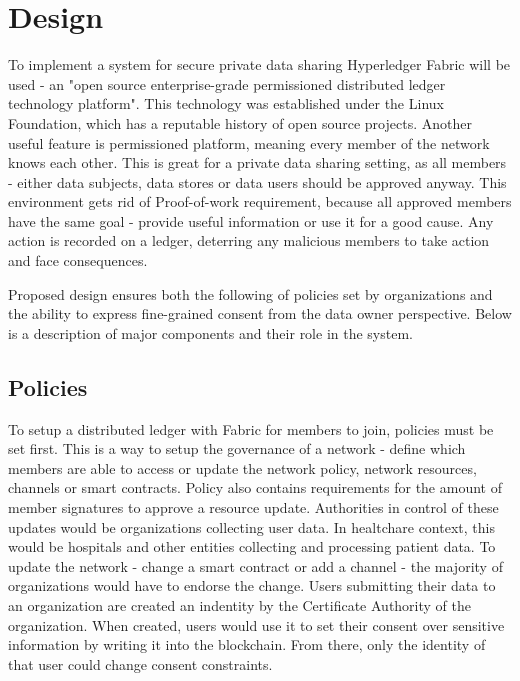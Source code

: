 \documentclass[12pt]{article}
\begin{document}
    \section{Design}

    To implement a system for secure private data sharing Hyperledger Fabric will be used - an "open source enterprise-grade permissioned distributed ledger technology platform"\cite{fabric}. This technology was established under the Linux Foundation, which has a reputable history of open source projects. Another useful feature is permissioned platform, meaning every member of the network knows each other. This is great for a private data sharing setting, as all members - either data subjects, data stores or data users should be approved anyway. This environment gets rid of Proof-of-work requirement, because all approved members have the same goal - provide useful information or use it for a good cause. Any action is recorded on a ledger, deterring any malicious members to take action and face consequences.
    

    Proposed design ensures both the following of policies set by organizations and the ability to express fine-grained consent from the data owner perspective. Below is a description of major components and their role in the system.

        \subsection{Policies}
        To setup a distributed ledger with Fabric for members to join, policies must be set first. This is a way to setup the governance of a network - define which members are able to access or update the network policy, network resources, channels or smart contracts. Policy also contains requirements for the amount of member signatures to approve a resource update. Authorities in control of these updates would be organizations collecting user data. In healtchare context, this would be hospitals and other entities collecting and processing patient data. To update the network - change a smart contract or add a channel - the majority of organizations would have to endorse the change. Users submitting their data to an organization are created an indentity by the Certificate Authority of the organization. When created, users would use it to set their consent over sensitive information by writing it into the blockchain. From there, only the identity of that user could change consent constraints.
\end{document}
